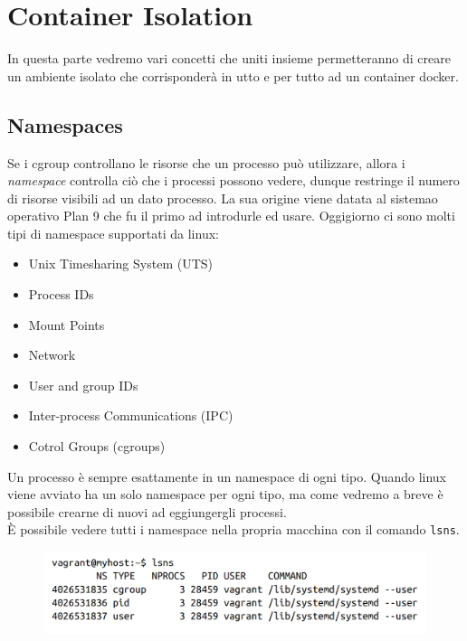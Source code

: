 \chapter{Container Isolation}

In questa parte vedremo vari concetti che uniti insieme permetteranno di creare
un ambiente isolato che corrisponderà in utto e per tutto ad un container docker.

\section{Namespaces}

Se i cgroup controllano le risorse che un processo può utilizzare, allora i
\textit{namespace} controlla ciò che i processi possono vedere, dunque restringe
il numero di risorse visibili ad un dato processo.
La sua origine viene datata al sistemao operativo Plan 9 che fu il primo ad
introdurle ed usare.
Oggigiorno ci sono molti tipi di namespace supportati da linux:

\begin{itemize}
    \item Unix Timesharing System (UTS)
    \item Process IDs
    \item Mount Points
    \item Network
    \item User and group IDs
    \item Inter-process Communications (IPC)
    \item Cotrol Groups (cgroups)
\end{itemize}

Un processo è sempre esattamente in un namespace di ogni tipo.
Quando linux viene avviato ha un solo namespace per ogni tipo, ma come vedremo
a breve è possibile crearne di nuovi ad eggiungergli processi.\\

È possibile vedere tutti i namespace nella propria macchina con il comando
\verb|lsns|.

\begin{figure}[H]
    \centering
    \includegraphics[width=\textwidth, keepaspectratio]{capitoli/os_security/imgs/namespace1.png}
\end{figure}

